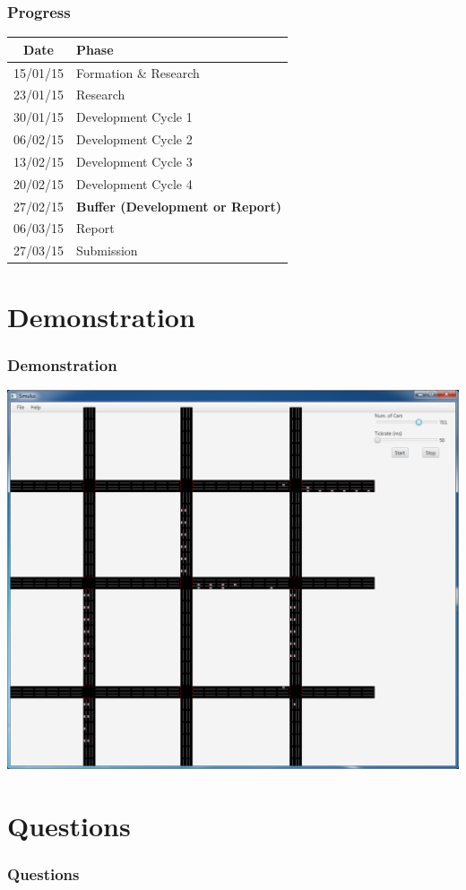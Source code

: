 \documentclass{beamer}
\begin{document}
\begin{frame}
\frametitle{Progress}


	\begin{tabular}{|c|l|}
	\hline
	\textbf{Date} & \textbf{Phase} \\ \hline
	15/01/15 & Formation \& Research \\ \hline
	23/01/15 & Research \\ \hline
	30/01/15 & Development Cycle 1 \\ \hline
	\rowcolor{LightCyan}
	06/02/15 & Development Cycle 2 \\ \hline
	13/02/15 & Development Cycle 3 \\ \hline
	20/02/15 & Development Cycle 4 \\ \hline
	27/02/15 & \textbf{Buffer (Development or Report)} \\ \hline
	06/03/15 & Report \\ \hline
	27/03/15 & Submission \\ \hline
	\end{tabular}
	
\end{frame}

\section{Demonstration}

\begin{frame}
\frametitle{Demonstration}
\includegraphics[scale=0.28]{screenshot}
\end{frame}

\section{Questions}

\begin{frame}
\frametitle{Questions}

\end{frame}
\end{document}
